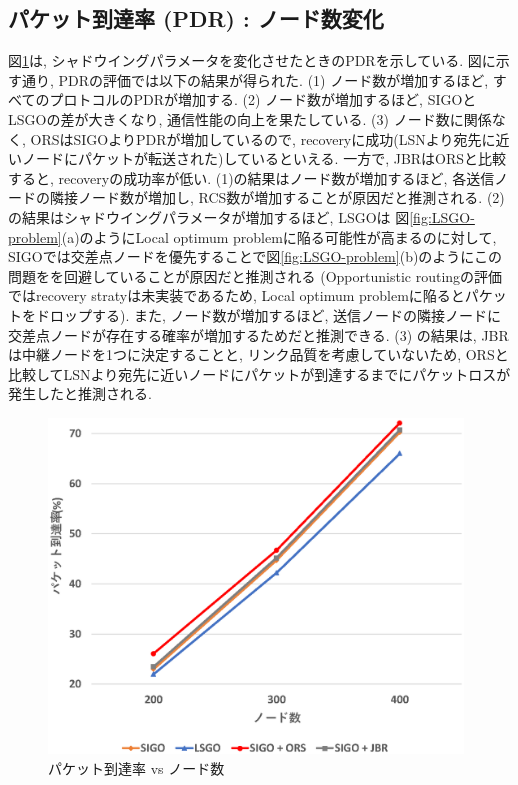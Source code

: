 \documentclass[10pt]{jreport}
\begin{document}
\subsection{パケット到達率 (PDR) : ノード数変化}

図\ref{fig:SIGO_PDR_num}は, シャドウイングパラメータを変化させたときのPDRを示している.
図に示す通り, PDRの評価では以下の結果が得られた.
(1) ノード数が増加するほど, すべてのプロトコルのPDRが増加する. 
(2) ノード数が増加するほど, SIGOとLSGOの差が大きくなり, 通信性能の向上を果たしている.
(3) ノード数に関係なく, ORSはSIGOよりPDRが増加しているので, recoveryに成功(LSNより宛先に近いノードにパケットが転送された)しているといえる. 一方で, JBRはORSと比較すると, recoveryの成功率が低い. 
(1)の結果はノード数が増加するほど, 各送信ノードの隣接ノード数が増加し, RCS数が増加することが原因だと推測される.
(2)の結果はシャドウイングパラメータが増加するほど, LSGOは 図\ref{fig:LSGO-problem}(a)のようにLocal optimum problemに陥る可能性が高まるのに対して, SIGOでは交差点ノードを優先することで図\ref{fig:LSGO-problem}(b)のようにこの問題をを回避していることが原因だと推測される (Opportunistic routingの評価ではrecovery stratyは未実装であるため, Local optimum problemに陥るとパケットをドロップする). また, ノード数が増加するほど, 送信ノードの隣接ノードに交差点ノードが存在する確率が増加するためだと推測できる.
(3) の結果は, JBRは中継ノードを1つに決定することと, リンク品質を考慮していないため, ORSと比較してLSNより宛先に近いノードにパケットが到達するまでにパケットロスが発生したと推測される. 

\begin{figure}[!ht]
	\centering
	\includegraphics[width=110mm]{figures/SIGO_PDR_num.eps}
	\caption{パケット到達率 vs ノード数}
	\label{fig:SIGO_PDR_num}
\end{figure}
\end{document}
